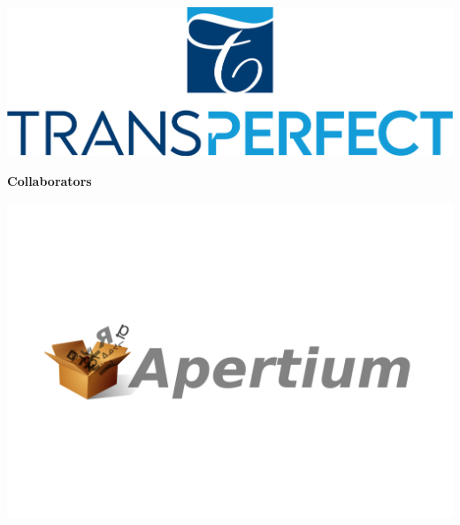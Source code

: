 \documentclass[11pt,oneside]{book}
\begin{document}
\begin{samepage}
\begin{minipage}[c][0.21\linewidth][c]{0.17\linewidth}
      \end{minipage}\hspace{0.05\linewidth}
          \begin{minipage}[c][0.21\linewidth][c]{0.17\linewidth}
        \includegraphics[width=\linewidth]{eamt_volume_1/sponsor_logos/TP_stacked_logo RGB-01.jpg}
      \end{minipage}\hspace{0.05\linewidth}
    
    \end{samepage}

  \bigskip
  \bigskip
    \begin{samepage}
  \noindent
  {\Large \textbf{Collaborators}}

  \nopagebreak
            \begin{minipage}[c][0.21\linewidth][c]{0.21\linewidth}
        \includegraphics[width=\linewidth]{eamt_volume_1/sponsor_logos/apertium_open_box_line.svg.pdf}
      \end{minipage}\hspace{0.05\linewidth}
    
    \end{samepage}
\end{document}
